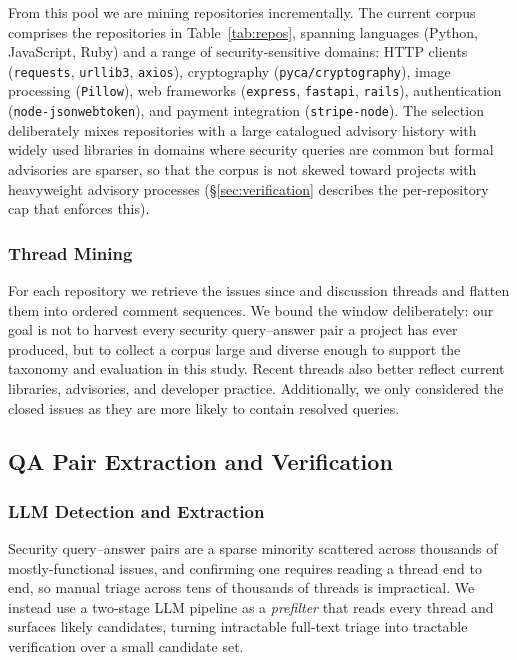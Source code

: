 From this pool we are mining repositories incrementally. The current corpus
comprises the  repositories in Table~\ref{tab:repos}, spanning
 languages (Python, JavaScript, Ruby) and a range of
security-sensitive domains:
HTTP clients (\texttt{requests}, \texttt{urllib3}, \texttt{axios}),
cryptography (\texttt{pyca/cryptography}), image processing (\texttt{Pillow}),
web frameworks (\texttt{express}, \texttt{fastapi}, \texttt{rails}),
authentication (\texttt{node-jsonwebtoken}), and payment integration
(\texttt{stripe-node}). The selection deliberately mixes repositories with a
large catalogued advisory history with widely used libraries in domains where
security queries are common but formal advisories are sparser, so that the
corpus is not skewed toward projects with heavyweight advisory processes
(\S\ref{sec:verification} describes the per-repository cap that enforces this).

\subsubsection{Thread Mining}
\label{sec:mining}

For each repository we retrieve the issues since  and
discussion threads and flatten them into ordered comment sequences. We bound the
window deliberately: our goal is not to harvest every security query--answer pair a
project has ever produced, but to collect a corpus large and diverse enough to
support the taxonomy and evaluation in this study. Recent threads also better
reflect current libraries, advisories, and developer practice. Additionally, we only considered
the closed issues as they are more likely to contain resolved queries.

\subsection{QA Pair Extraction and Verification}
\label{sec:phase-extraction}

\subsubsection{LLM Detection and Extraction}
\label{sec:extraction}

Security query--answer pairs are a sparse minority scattered across thousands of
mostly-functional issues, and confirming one requires reading a thread end to
end, so manual triage across tens of thousands of threads is impractical. We
instead use a two-stage LLM pipeline as a \emph{prefilter} that reads every
thread and surfaces likely candidates, turning intractable full-text triage into
tractable verification over a small candidate set.

